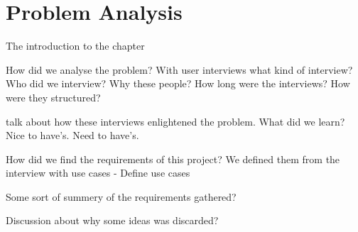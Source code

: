 \section{Problem Analysis}
The introduction to the chapter


How did we analyse the problem?
	With user interviews
		what kind of interview?
		Who did we interview?
			Why these people?
		How long were the interviews?
			How were they structured?

	talk about how these interviews enlightened the problem.
		What did we learn?
			Nice to have's.
			Need to have's.
	

How did we find the requirements of this project?
	We defined them from the interview with use cases - 
		Define use cases
	
	Some sort of summery of the requirements gathered?


Discussion about why some ideas was discarded?











